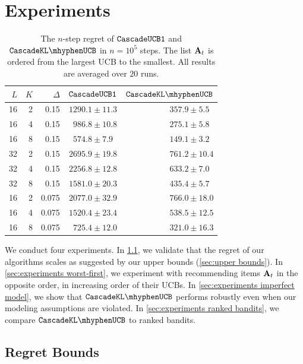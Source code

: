 
\section{Experiments}
\label{sec:experiments}

\begin{table}[t]
  \centering
  {\small
  \begin{tabular}{rrr|rr} \hline
    $L$ & $K$ & $\Delta$ & ${\tt CascadeUCB1}$ & $\cascadeklucb$ \\ \hline
    16 & 2 & 0.15 & $1290.1 \pm 11.3$ & $357.9 \pm 5.5\phantom{0}$ \\
    16 & 4 & 0.15 & $986.8 \pm 10.8$ & $275.1 \pm 5.8\phantom{0}$ \\
    16 & 8 & 0.15 & $574.8 \pm 7.9\phantom{0}$ & $149.1 \pm 3.2\phantom{0}$ \\
    32 & 2 & 0.15 & $2695.9 \pm 19.8$ & $761.2 \pm 10.4$ \\
    32 & 4 & 0.15 & $2256.8 \pm 12.8$ & $633.2 \pm 7.0\phantom{0}$ \\
    32 & 8 & 0.15 & $1581.0 \pm 20.3$ & $435.4 \pm 5.7\phantom{0}$ \\
    16 & 2 & 0.075 & $2077.0 \pm 32.9$ & $766.0 \pm 18.0$ \\
    16 & 4 & 0.075 & $1520.4 \pm 23.4$ & $538.5 \pm 12.5$ \\
    16 & 8 & 0.075 & $725.4 \pm 12.0$ & $321.0 \pm 16.3$ \\ \hline
  \end{tabular}
  }
  \caption{The $n$-step regret of ${\tt CascadeUCB1}$ and $\cascadeklucb$ in $n = 10^5$ steps. The list $\mathbf{A}_t$ is ordered from the largest UCB to the smallest. All results are averaged over $20$ runs.}
  \label{tab:regret bounds}
\end{table}

We conduct four experiments. In \cref{sec:experiments regret bounds}, we validate that the regret of our algorithms scales as suggested by our upper bounds (\cref{sec:upper bounds}). In \cref{sec:experiments worst-first}, we experiment with recommending items $\mathbf{A}_t$ in the opposite order, in increasing order of their UCBs. In \cref{sec:experiments imperfect model}, we show that $\cascadeklucb$ performs robustly even when our modeling assumptions are violated. In \cref{sec:experiments ranked bandits}, we compare $\cascadeklucb$ to ranked bandits.


\subsection{Regret Bounds}
\label{sec:experiments regret bounds}

